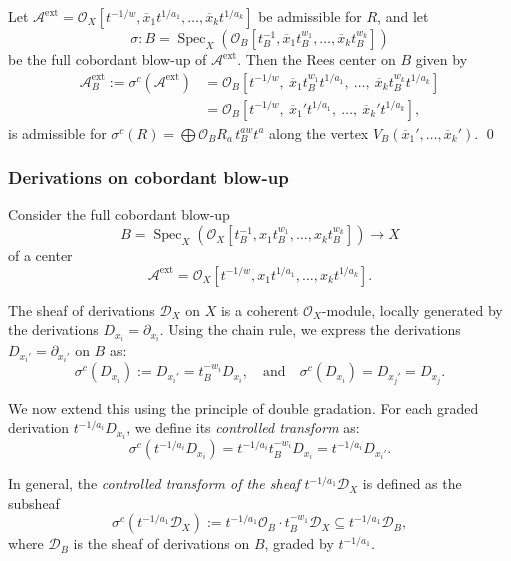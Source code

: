 \documentclass{amsart}
\newcommand{\ext}{{\operatorname{ext}}}
\newcommand{\Spec}{\operatorname{Spec}}
\begin{document}
\begin{lemma} \label{algebra}
Let \( \mathcal{A}^\ext = \mathcal{O}_X[t^{-1/w}, \overline{x}_1 t^{1/a_1}, \ldots, \overline{x}_k t^{1/a_k}]\) be admissible for \( R \), and let
\[
\sigma : B = \Spec_X \left(\mathcal{O}_B[t_B^{-1}, \overline{x}_1 t_B^{w_1}, \ldots, \overline{x}_k t_B^{w_k}] \right)
\]
be the full cobordant blow-up of \( \mathcal{A}^\ext \). Then the Rees center on \( B \)  given by
\begin{align*}
\mathcal{A}^\ext_B := \sigma^c(\mathcal{A}^\ext) 
&= \mathcal{O}_B\left[t^{-1/w},\ \overline{x}_1 t_B^{w_1} t^{1/a_1},\ \ldots,\ \overline{x}_k t_B^{w_k} t^{1/a_k}\right] \\
&= \mathcal{O}_B\left[t^{-1/w},\ \overline{x}_1' t^{1/a_1},\ \ldots,\ \overline{x}_k' t^{1/a_k}\right],
\end{align*}
is admissible for 
$
\sigma^c(R) = \bigoplus \mathcal{O}_B R_a\, t_B^{aw} t^a
$
along the vertex \( V_B(\overline{x}_1', \ldots, \overline{x}_k') \). \qed
\end{lemma}

\subsubsection{Derivations on cobordant blow-up} %
\label{derivations}

Consider the full cobordant blow-up
\[
B = \Spec_X\left( \mathcal{O}_X[t_B^{-1}, x_1 t_B^{w_1}, \ldots, x_k t_B^{w_k}] \right) \to X
\]
of a center 
\[
\mathcal{A}^\ext = \mathcal{O}_X[t^{-1/w}, x_1 t^{1/a_1}, \ldots, x_k t^{1/a_k}].
\]

The sheaf of derivations \( \mathcal{D}_X \) on \( X \) is a coherent \( \mathcal{O}_X \)-module, locally generated by the derivations \( D_{x_i}=\partial_{x_i} \). Using the chain rule, we express the derivations \( D_{x_i'}=\partial_{x_i'} \) on \( B \) as:
\[
\sigma^c(D_{x_i}):=D_{x_i'} = t_B^{-w_i} D_{x_i}, \quad \text{and} \quad \sigma^c(D_{x_i})=D_{x_j'} = D_{x_j}.
\]

We now extend this using the principle of double gradation. For each graded derivation \( t^{-1/a_i} D_{x_i} \), we define its \emph{controlled transform} as:
\[
\sigma^c(t^{-1/a_i} D_{x_i}) = t^{-1/a_i} t_B^{-w_i} D_{x_i} = t^{-1/a_i} D_{x_i'}.
\]


In general, the {\it controlled transform of the sheaf} \( t^{-1/a_1} \mathcal{D}_X \) is defined as the subsheaf
\[
\sigma^c(t^{-1/a_1} \mathcal{D}_X) := t^{-1/a_1} \mathcal{O}_B \cdot t_B^{-w_1} \mathcal{D}_X \subseteq t^{-1/a_1} \mathcal{D}_B,
\]
where \( \mathcal{D}_B \) is the sheaf of derivations on \( B \), graded by \( t^{-1/a_1} \).
\end{document}

